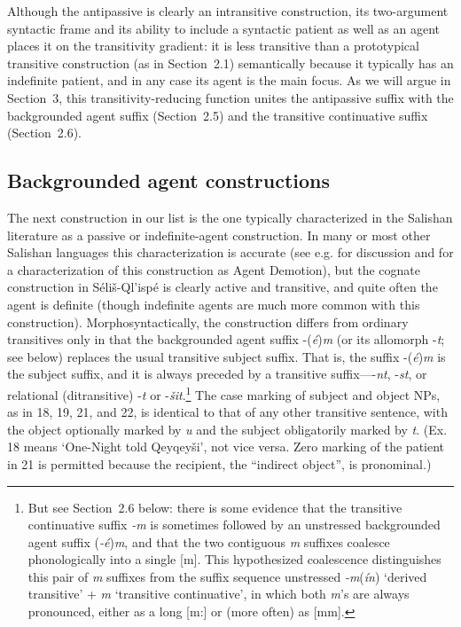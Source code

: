 \documentclass[output=paper,colorlinks,citecolor=brown]{langscibook}
\begin{document}
\bigskip

Although the antipassive is clearly an intransitive construction, its
two-argument syntactic frame and its ability to include a syntactic
patient as well as an agent places it on the transitivity gradient: it
is less transitive than a prototypical transitive construction (as in
Section~2.1) semantically because it typically has an indefinite patient,
and in any case its agent is the main focus.  As we will argue in Section~3, this transitivity-reducing function unites the antipassive suffix
with the backgrounded agent suffix (Section~2.5) and the transitive
continuative suffix (Section~2.6).

\subsection{Backgrounded agent constructions} %

The next construction in our list is the one typically characterized
in the Salishan literature as a passive or indefinite-agent
construction.  In many or most other Salishan languages this
characterization is accurate (see e.g. \cite[25--28]{Kroeber:1999} for
discussion and for a characterization of this construction as Agent
Demotion), but the cognate construction in S\'eli\v{s}-Ql'isp\'e is
clearly active and transitive, and quite often the agent is definite
(though indefinite agents are much more common with this
construction).  Morphosyntactically, the construction differs from
ordinary transitives only in that the backgrounded agent suffix -(\emph{\'e})\emph{m} (or its allomorph -\emph{t}; see below) replaces the
usual transitive subject suffix.  That is, the suffix -(\emph{\'e})\emph{m} is the subject suffix, and it is always preceded by a transitive
suffix---{-\emph{nt}}, -\emph{st}, or relational (ditransitive) -\emph{{\textltilde}t} or -\emph{\v{s}it}.\footnote{But see Section~2.6 below:
there is some evidence that the transitive continuative suffix \emph{-m} is sometimes followed by an unstressed backgrounded agent suffix
(\emph{-\'e})\emph{m}, and that the two contiguous \emph{m} suffixes
coalesce phonologically into a single [m].  This hypothesized
coalescence distinguishes this pair of \emph{m} suffixes from the
suffix sequence unstressed \emph{-m}(\emph{\'in}) `derived transitive' +
\emph{m} `transitive continuative', in which both \emph{m}'s are always
pronounced, either as a long [m:] or (more often) as [m{\textschwa}m].
} The case marking of subject and object NPs, as in 18, 19, 21, and
22, is identical to that of any other transitive sentence, with the
object optionally marked by \emph{{\textltilde}u} and the subject
obligatorily marked by \emph{t}.  (Ex. 18 means `One-Night told
Qeyqey\v{s}i', not vice versa.  Zero marking of the patient in 21 is
permitted because the recipient, the ``indirect object'', is
pronominal.)
\end{document}
